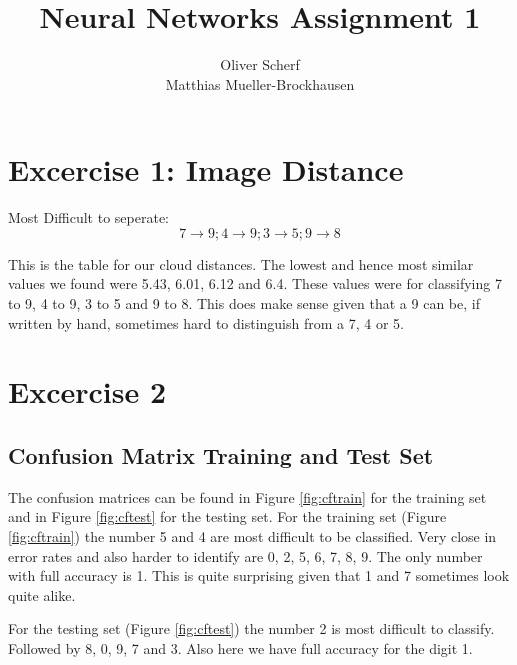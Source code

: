 \documentclass{article}
\begin{document}
\title{Neural Networks Assignment 1}
\author{Oliver Scherf\\Matthias Mueller-Brockhausen}
\maketitle
\lstset{
  basicstyle=\ttfamily,
  keywordstyle=\bfseries,
  language=Java,
  frame=single,
  aboveskip=11pt,
  belowskip=11pt,
  breaklines=true,
  breakatwhitespace=false,
  showspaces=false,
  showstringspaces=false,
  numbers=left,
  stepnumber=1,    
  firstnumber=1,
  numberfirstline=true
}
\section{Excercise 1: Image Distance}
\label{a1}
Most Difficult to seperate: \[ 7 \rightarrow 9; 4 \rightarrow 9; 3 \rightarrow 5; 9 \rightarrow 8\]

This is the table for our cloud distances.
The lowest and hence most similar values we found were 5.43, 6.01, 6.12 and 6.4.
These values were for classifying 7 to 9, 4 to 9, 3 to 5 and 9 to 8.
This does make sense given that a 9 can be, if written by hand, sometimes hard to distinguish from a 7, 4 or 5.


\section{Excercise 2}
\subsection{Confusion Matrix Training and Test Set}
The confusion matrices can be found in Figure \ref{fig:cftrain} for the training set and in Figure \ref{fig:cftest} for the testing set.
For the training set (Figure \ref{fig:cftrain}) the number 5 and 4 are most difficult to be classified. Very close in error rates and also harder to identify are 0, 2, 5, 6, 7, 8, 9. The only number with full accuracy is 1. This is quite surprising given that 1 and 7 sometimes look quite alike.

For the testing set (Figure \ref{fig:cftest}) the number 2 is most difficult to classify. Followed by 8, 0, 9, 7 and 3. Also here we have full accuracy for the digit 1.
\end{document}
